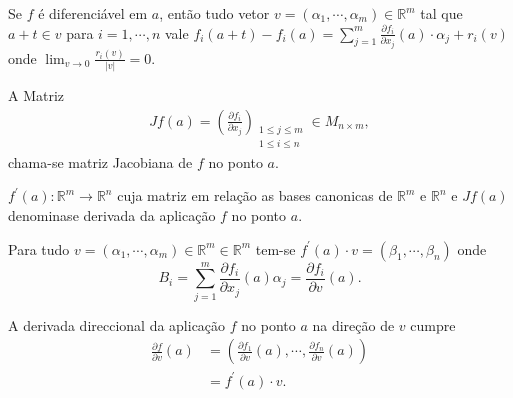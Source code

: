 \begin{note}
  Se $f$ é diferenciável em $a$, então tudo vetor $v=(\alpha_1,\cdots,\alpha_m)\in\mathbb{R}^{m}$ tal que $a+t\in v$ para $i=1,\cdots,n$ vale $f_i(a+t)-f_i(a)=\sum_{j=1}^{m}\frac{\partial f_{i}}{\partial x_{j}}(a)\cdot\alpha_{j}+r_{i}(v)$ onde $\lim_{v \to 0}\frac{r_{i}(v)}{|v|}=0$.

  A Matriz
  \begin{align*}
    Jf(a)=\left( \frac{\partial f_{i}}{\partial x_{j}} \right)_{\substack{1\leq j\leq m\\ 1\leq i\leq n}}\in M_{n\times m},
  \end{align*}
  chama-se matriz Jacobiana de $f$ no ponto $a$.

  $f^\prime(a):\mathbb{R}^{m}\to\mathbb{R}^{n}$ cuja matriz em relação as bases canonicas de $\mathbb{R}^{m}$ e $\mathbb{R}^{n}$  e $Jf(a)$ denominase derivada da aplicação $f$ no ponto $a$.

  Para tudo $v=(\alpha_1,\cdots,\alpha_m)\in\mathbb{R}^{m}\in\mathbb{R}^{m}$ tem-se $f^\prime(a)\cdot v=(\beta_{1},\cdots,\beta_{n})$ onde 
  $$\displaystyle B_{i}=\sum_{j=1}^{m}\frac{\partial f_{i}}{\partial x_j}(a)\alpha_{j}=\frac{\partial f_{i}}{\partial v}(a).$$ 
\end{note}
\begin{note}
  A derivada direccional da aplicação $f$ no ponto $a$ na direção de $v$ cumpre
  \begin{align*}
    \frac{\partial f}{\partial v}(a)&=\left( \frac{\partial f_1}{\partial v}(a),\cdots,\frac{\partial f_n}{\partial v}(a) \right)\\
    &=f^\prime(a)\cdot v.
  \end{align*}
\end{note}
